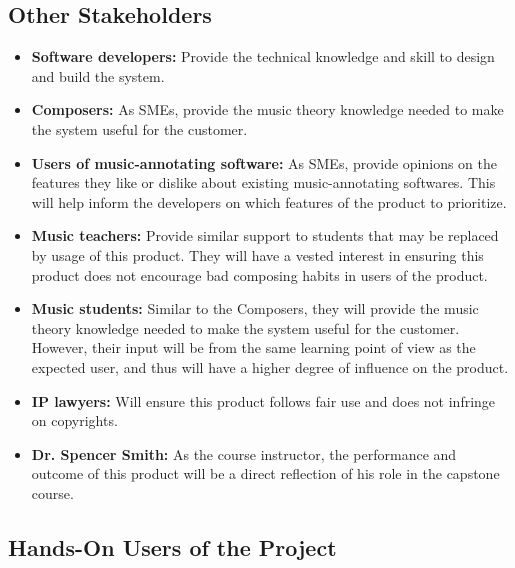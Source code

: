 \documentclass[12pt]{article}
\begin{document}
\subsection{Other Stakeholders}
\begin{itemize}
  \item \textbf{Software developers:} Provide the technical knowledge and skill to design and build the system.
  \item \textbf{Composers:} As SMEs, provide the music theory knowledge needed to make the system useful for the customer.
  \item \textbf{Users of music-annotating software:} As SMEs, provide opinions on the features they like or dislike about existing music-annotating softwares. This will help inform the developers on which features of the product to prioritize.
  \item \textbf{Music teachers:} Provide similar support to students that may be replaced by usage of this product. They will have a vested interest in ensuring this product does not encourage bad composing habits in users of the product.
  \item \textbf{Music students:} Similar to the Composers, they will provide the music theory knowledge needed to make the system useful for the customer. However, their input will be from the same learning point of view as the expected user, and thus will have a higher degree of influence on the product.
  \item \textbf{IP lawyers:} Will ensure this product follows fair use and does not infringe on copyrights.
  \item \textbf{Dr. Spencer Smith:} As the course instructor, the performance and outcome of this product will be a direct reflection of his role in the capstone course.
\end{itemize}
\subsection{Hands-On Users of the Project}
\end{document}
